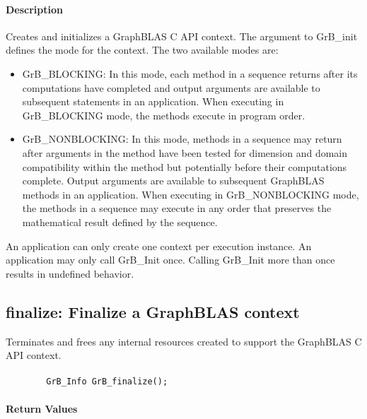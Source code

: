 \paragraph{Description}

Creates and initializes a GraphBLAS C API context.  The argument
to {\sf GrB\_init} defines the mode for the context.  The two
available modes are:

\begin{itemize}
\item {\sf GrB\_BLOCKING}: In this mode, each method in a sequence returns after
its computations have completed and output arguments are available to
subsequent statements in an application.  When executing in {\sf
GrB\_BLOCKING} mode, the methods execute in program order.

\item {\sf GrB\_NONBLOCKING}: In this mode, methods in a sequence may return after arguments
in the method have been tested for dimension and domain compatibility
within the method but potentially before their computations complete.  Output
arguments are available to subsequent GraphBLAS methods in an application.
When executing in {\sf GrB\_NONBLOCKING} mode, the methods in a sequence
may execute in any order that preserves the mathematical result defined
by the sequence.
\end{itemize}

An application can only create one context per execution instance.  An application
may only call {\sf GrB\_Init} once.  Calling {\sf GrB\_Init} more
than once results in undefined behavior.

\subsection{{\sf finalize}: Finalize a GraphBLAS context}
\label{Sec:GrB_finalize}

Terminates and frees any internal resources created to support the
GraphBLAS C API context.

\paragraph{\syntax}

\begin{verbatim}
        GrB_Info GrB_finalize();
\end{verbatim}

\paragraph{Return Values}

